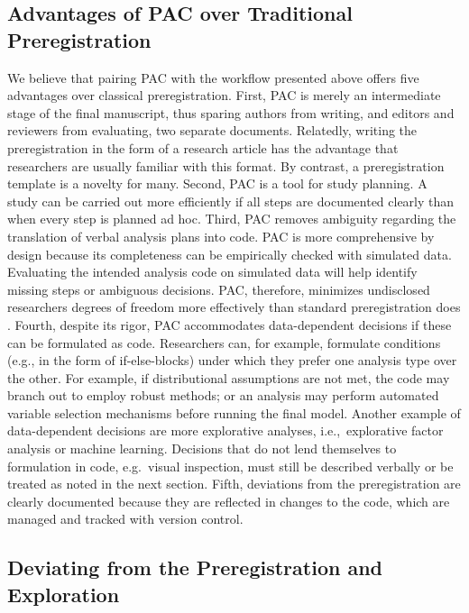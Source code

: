 \documentclass[psych,tutorial,accept,moreauthors,pdftex]{Definitions/mdpi}
\begin{document}
\begin{paracol}{2}
\subsection{Advantages of PAC over Traditional
Preregistration}\label{advantages-of-pac-over-traditional-preregistration}

We believe that pairing PAC with the workflow presented above offers
five advantages over classical preregistration. First, PAC is merely an
intermediate stage of the final manuscript, thus sparing authors from
writing, and editors and reviewers from evaluating, two separate
documents. Relatedly, writing the preregistration in the form of a
research article has the advantage that researchers are usually familiar
with this format. By contrast, a preregistration template is a novelty
for many. Second, PAC is a tool for study planning. A study can be
carried out more efficiently if all steps are documented clearly than
when every step is planned ad hoc. Third, PAC removes ambiguity
regarding the translation of verbal analysis plans into code. PAC is
more comprehensive by design because its completeness can be empirically
checked with simulated data. Evaluating the intended analysis code on
simulated data will help identify missing steps or ambiguous decisions.
PAC, therefore, minimizes undisclosed researchers degrees of freedom
more effectively than standard preregistration does
\citep{bakkerEnsuringQualitySpecificity2020, wichertsDegreesFreedomPlanning2016}.
Fourth, despite its rigor, PAC accommodates data-dependent decisions if
these can be formulated as code. Researchers can, for example, formulate
conditions (e.g., in the form of if-else-blocks) under which they prefer
one analysis type over the other. For example, if distributional
assumptions are not met, the code may branch out to employ robust
methods; or an analysis may perform automated variable selection
mechanisms before running the final model. Another example of
data-dependent decisions are more explorative analyses, i.e.,~explorative
factor analysis or machine learning. Decisions that do not lend
themselves to formulation in code, e.g.~visual inspection, must still be
described verbally or be treated as noted in the next section. Fifth,
deviations from the preregistration are clearly documented because they
are reflected in changes to the code, which are managed and tracked with
version control.

\subsection{Deviating from the Preregistration and
Exploration}\label{deviating-from-the-preregistration-and-exploration}


\end{paracol}
\end{document}
